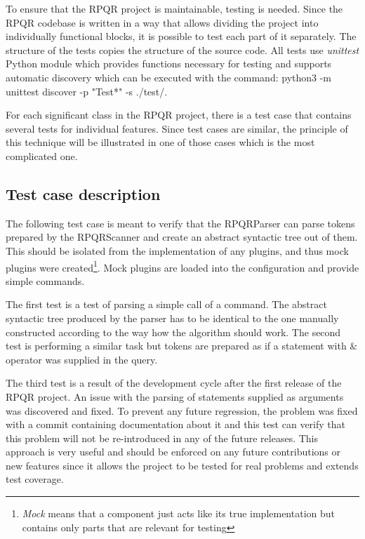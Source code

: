 To ensure that the RPQR project is maintainable, testing is needed. Since the RPQR codebase is written
in a way that allows dividing the project into individually functional blocks, it is possible to test
each part of it separately. The structure of the tests copies the structure of the source code.
All tests use \textit{unittest}\cite{unittest} Python module which provides functions necessary for testing and
supports automatic discovery which can be executed with the command: python3 -m unittest discover -p "Test*" -s ./test/.

For each significant class in the RPQR project, there is a test case that contains several tests for
individual features. Since test cases are similar, the principle of this technique will be illustrated
in one of those cases which is the most complicated one.

\subsection*{Test case description}

The following test case is meant to verify that the RPQRParser can parse tokens prepared by the RPQRScanner
and create an abstract syntactic tree out of them. This should be isolated from the implementation
of any plugins, and thus mock plugins were created\footnote{\textit{Mock} means that a component just acts like
its true implementation but contains only parts that are relevant for testing}. Mock plugins are loaded
into the configuration and provide simple commands.

The first test is a test of parsing a simple call of a command. The abstract syntactic tree produced by
the parser has to be identical to the one manually constructed according to the way how the algorithm
should work. The second test is performing a similar task but tokens are prepared as if a statement
with $\&$ operator was supplied in the query.

The third test is a result of the development cycle after the first release of the RPQR project. An issue
with the parsing of statements supplied as arguments was discovered and fixed. To prevent any future
regression, the problem was fixed with a commit containing documentation about it and this test can verify
that this problem will not be re-introduced in any of the future releases. This approach is very
useful and should be enforced on any future contributions or new features since it allows the project
to be tested for real problems and extends test coverage.

